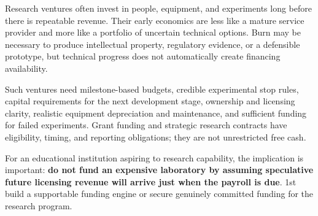 Research ventures often invest in people, equipment, and experiments long before there is repeatable revenue. Their early economics are less like a mature service provider and more like a portfolio of uncertain technical options. Burn may be necessary to produce intellectual property, regulatory evidence, or a defensible prototype, but technical progress does not automatically create financing availability.

Such ventures need milestone-based budgets, credible experimental stop rules, capital requirements for the next development stage, ownership and licensing clarity, realistic equipment depreciation and maintenance, and sufficient funding for failed experiments. Grant funding and strategic research contracts have eligibility, timing, and reporting obligations; they are not unrestricted free cash.

For an educational institution aspiring to research capability, the implication is important: \textbf{do not fund an expensive laboratory by assuming speculative future licensing revenue will arrive just when the payroll is due}. 1st build a supportable funding engine or secure genuinely committed funding for the research program.
